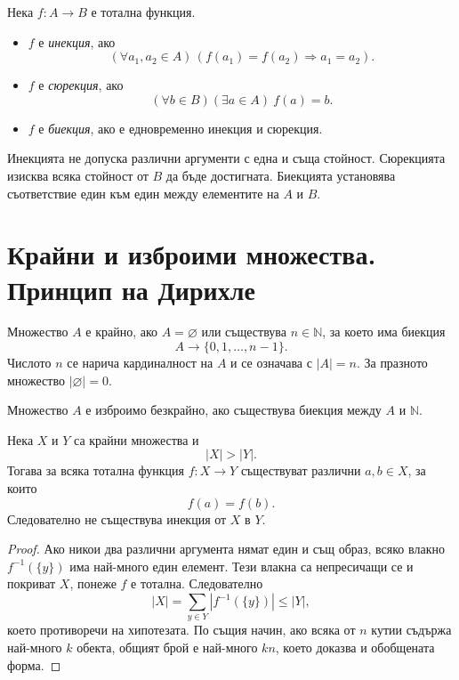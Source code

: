 \begin{keydefn}
Нека $f:A\to B$ е тотална функция.

\begin{itemize}
\item $f$ е \emph{инекция}, ако
\[
(\forall a_1,a_2\in A)\,
(f(a_1)=f(a_2)\Rightarrow a_1=a_2).
\]

\item $f$ е \emph{сюрекция}, ако
\[
(\forall b\in B)(\exists a\in A)\ f(a)=b.
\]

\item $f$ е \emph{биекция}, ако е едновременно инекция и сюрекция.
\end{itemize}
\end{keydefn}

Инекцията не допуска различни аргументи с една и съща стойност. Сюрекцията изисква всяка стойност от $B$ да бъде достигната. Биекцията установява съответствие един към един между елементите на $A$ и $B$.

\section{Крайни и изброими множества. Принцип на Дирихле}\label{s:1.7}

\begin{keydefn}
Множество $A$ е крайно, ако $A=\varnothing$ или съществува $n\in\mathbb N$, за което има биекция
\[
A\longrightarrow \{0,1,\ldots,n-1\}.
\]
Числото $n$ се нарича кардиналност на $A$ и се означава с $|A|=n$. За празното множество $|\varnothing|=0$.
\end{keydefn}

\begin{keydefn}
Множество $A$ е изброимо безкрайно, ако съществува биекция между $A$ и $\mathbb N$.
\end{keydefn}

\begin{keythm}
Нека $X$ и $Y$ са крайни множества и
\[
|X|>|Y|.
\]
Тогава за всяка тотална функция $f:X\to Y$ съществуват различни $a,b\in X$, за които
\[
f(a)=f(b).
\]
Следователно не съществува инекция от $X$ в $Y$.
\end{keythm}

\begin{proof}
Ако никои два различни аргумента нямат един и същ образ, всяко влакно $f^{-1}(\{y\})$ има най-много един елемент. Тези влакна са непресичащи се и покриват $X$, понеже $f$ е тотална. Следователно
\[|X|=\sum_{y\in Y}|f^{-1}(\{y\})|\le |Y|,\]
което противоречи на хипотезата. По същия начин, ако всяка от $n$ кутии съдържа най-много $k$ обекта, общият брой е най-много $kn$, което доказва и обобщената форма.
\end{proof}

